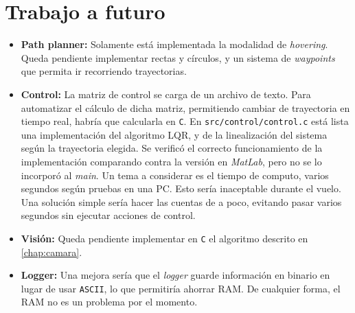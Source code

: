 \documentclass[main]{subfiles}
\begin{document}
\section{Trabajo a futuro}
\label{sec:codigo:trabajo-a-futuro}

\begin{itemize}
\item \textbf{Path planner:} Solamente está implementada la modalidad de \textit{hovering}. Queda pendiente implementar rectas y círculos, y un sistema de \textit{waypoints} que permita ir recorriendo trayectorias.
\item \textbf{Control:} La matriz de control se carga de un archivo de texto. Para automatizar el cálculo de dicha matriz, permitiendo cambiar de trayectoria en tiempo real, habría que calcularla en \verb+C+.\newline
En \verb+src/control/control.c+ está lista una implementación del algoritmo LQR, y de la linealización del sistema según la trayectoria elegida. Se verific\'o el correcto funcionamiento de la implementaci\'on comparando contra la versi\'on en \textit{MatLab}, pero no se lo incorpor\'o al \textit{main}.\newline
Un tema a considerar es el tiempo de computo, varios segundos seg\'un pruebas en una PC. Esto ser\'ia inaceptable durante el vuelo. Una soluci\'on simple ser\'ia hacer las cuentas de a poco, evitando pasar varios segundos sin ejecutar acciones de control.
\item \textbf{Visión:} Queda pendiente implementar en \verb+C+ el algoritmo descrito en \ref{chap:camara}.
\item \textbf{Logger:} Una mejora sería que el \textit{logger} guarde información en binario en lugar de usar \verb+ASCII+, lo que permitiría ahorrar RAM. De cualquier forma, el RAM no es un problema por el momento.
\end{itemize}
\end{document}
